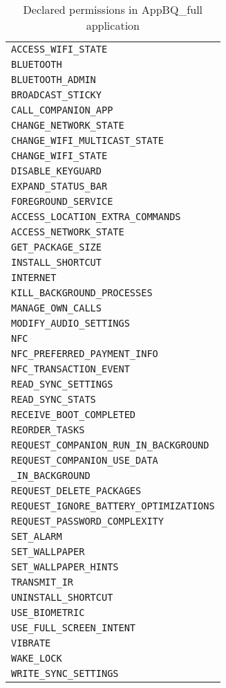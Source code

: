 \documentclass[
  a4paper,  %
  twoside,  %
  bibliography=totoc,
  headsepline,
  cleardoublepage=empty,
  parskip=half,
  draft=false,
  open=any
]{scrbook}
\begin{document}
\begin{table}
\begin{tabular}{|p{6.5cm}|}
\texttt{ACCESS\_WIFI\_STATE} \\
\texttt{BLUETOOTH} \\
\texttt{BLUETOOTH\_ADMIN} \\
\texttt{BROADCAST\_STICKY} \\
\texttt{CALL\_COMPANION\_APP} \\
\texttt{CHANGE\_NETWORK\_STATE} \\
\texttt{CHANGE\_WIFI\_MULTICAST\_STATE} \\
\texttt{CHANGE\_WIFI\_STATE} \\
\texttt{DISABLE\_KEYGUARD} \\
\texttt{EXPAND\_STATUS\_BAR} \\
\texttt{FOREGROUND\_SERVICE} \\
\texttt{ACCESS\_LOCATION\_EXTRA\_COMMANDS} \\
\texttt{ACCESS\_NETWORK\_STATE} \\
\texttt{GET\_PACKAGE\_SIZE} \\
\texttt{INSTALL\_SHORTCUT} \\
\texttt{INTERNET} \\
\texttt{KILL\_BACKGROUND\_PROCESSES} \\
\texttt{MANAGE\_OWN\_CALLS} \\
\texttt{MODIFY\_AUDIO\_SETTINGS} \\
\texttt{NFC} \\
\texttt{NFC\_PREFERRED\_PAYMENT\_INFO} \\
\texttt{NFC\_TRANSACTION\_EVENT} \\
\texttt{READ\_SYNC\_SETTINGS} \\
\texttt{READ\_SYNC\_STATS} \\
\texttt{RECEIVE\_BOOT\_COMPLETED} \\
\texttt{REORDER\_TASKS} \\
\texttt{REQUEST\_COMPANION\_RUN\_IN\_BACKGROUND} \\
\texttt{REQUEST\_COMPANION\_USE\_DATA} \\
\qquad\qquad\texttt{\_IN\_BACKGROUND} \\
\texttt{REQUEST\_DELETE\_PACKAGES} \\
\texttt{REQUEST\_IGNORE\_BATTERY\_OPTIMIZATIONS} \\
\texttt{REQUEST\_PASSWORD\_COMPLEXITY} \\
\texttt{SET\_ALARM} \\
\texttt{SET\_WALLPAPER} \\
\texttt{SET\_WALLPAPER\_HINTS} \\
\texttt{TRANSMIT\_IR} \\
\texttt{UNINSTALL\_SHORTCUT} \\
\texttt{USE\_BIOMETRIC} \\
\texttt{USE\_FULL\_SCREEN\_INTENT} \\
\texttt{VIBRATE} \\
\texttt{WAKE\_LOCK} \\
\texttt{WRITE\_SYNC\_SETTINGS} \\
\hline
\end{tabular}
\caption{Declared permissions in AppBQ\_full application}
\label{appbqfperms}
\end{table}
\end{document}
